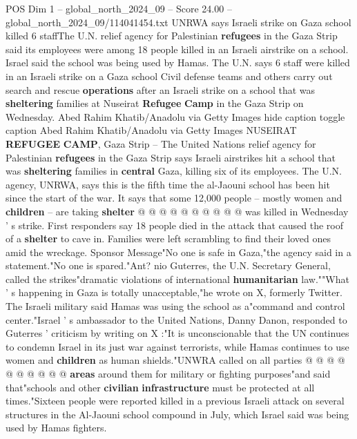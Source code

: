\begin{textsample}{POS Dim 1 – global\_north\_2024\_09 – Score 24.00 – global\_north\_2024\_09/114041454.txt}  \label{ex:f1_pos_430}
UNRWA says Israeli strike on Gaza school killed 6 staffThe U.N. relief agency for Palestinian \textbf{refugees} in the Gaza Strip said its employees were among 18 people killed in an Israeli airstrike on a school.
Israel said the school was being used by Hamas.
The U.N. says 6 staff were killed in an Israeli strike on a Gaza school Civil defense teams and others carry out search and rescue \textbf{operations} after an Israeli strike on a school that was \textbf{sheltering} families at Nuseirat \textbf{Refugee} \textbf{Camp} in the Gaza Strip on Wednesday.
Abed Rahim Khatib/Anadolu via Getty Images hide caption toggle caption Abed Rahim Khatib/Anadolu via Getty Images NUSEIRAT \textbf{REFUGEE} \textbf{CAMP}, Gaza Strip -- The United Nations relief agency for Palestinian \textbf{refugees} in the Gaza Strip says Israeli airstrikes hit a school that was \textbf{sheltering} families in \textbf{central} Gaza, killing six of its employees.
The U.N. agency, UNRWA, says this is the fifth time the al-Jaouni school has been hit since the start of the war.
It says that some 12,000 people -- mostly women and \textbf{children} -- are taking \textbf{shelter} @ @ @ @ @ @ @ @ @ @ was killed in Wednesday ' s strike.
First responders say 18 people died in the attack that caused the roof of a \textbf{shelter} to cave in.
Families were left scrambling to find their loved ones amid the wreckage.
Sponsor Message"No one is safe in Gaza,"the agency said in a statement."No one is spared."Ant? nio Guterres, the U.N.
Secretary General, called the strikes"dramatic violations of international \textbf{humanitarian} law.""What ' s happening in Gaza is totally unacceptable,"he wrote on X, formerly Twitter.
The Israeli military said Hamas was using the school as a"command and control center."Israel ' s ambassador to the United Nations, Danny Danon, responded to Guterres ' criticism by writing on X :"It is unconscionable that the UN continues to condemn Israel in its just war against terrorists, while Hamas continues to use women and \textbf{children} as human shields."UNWRA called on all parties @ @ @ @ @ @ @ @ @ @ \textbf{areas} around them for military or fighting purposes"and said that"schools and other \textbf{civilian} \textbf{infrastructure} must be protected at all times."Sixteen people were reported killed in a previous Israeli attack on several structures in the Al-Jaouni school compound in July, which Israel said was being used by Hamas fighters.

\end{textsample}
